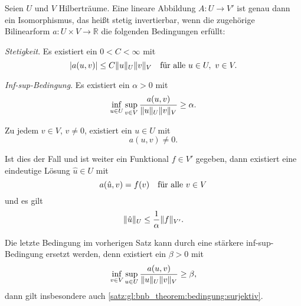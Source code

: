\begin{Satz}
\label{satz:gl:bnb_theorem}
    Seien $U$ und $V$ Hilberträume.
    Eine lineare Abbildung $A \colon U \to V'$ ist genau dann ein Isomorphismus, das heißt stetig invertierbar, wenn die zugehörige Bilinearform $a \colon U \times V \to \mathbb{R}$ die folgenden Bedingungen erfüllt:
    \begin{thmenumerate}
        \item \label{satz:gl:bnb_theorem:bedingung:stetig}
        \emph{Stetigkeit}.
        Es existiert ein $0 < C < \infty$ mit
        \begin{equation}
            \abs{a(u, v)} \leq C \norm{u}_{U} \norm{v}_{V} \quad \fa u \in U,~v\in V.
        \end{equation}
        \item \label{satz:gl:bnb_theorem:bedingung:inf_sup}
        \emph{Inf-sup-Bedingung}.
        Es existiert ein $\alpha > 0$ mit
        \begin{equation}
            \inf_{u \in U} \sup_{v \in V} \frac{a(u, v)}{\norm{u}_{U} \norm{v}_{V}} \geq \alpha.
        \end{equation}
        \item \label{satz:gl:bnb_theorem:bedingung:surjektiv}
        Zu jedem $v \in V$, $v \neq 0$, existiert ein $u \in U$ mit
        \begin{equation}
            a(u, v) \neq 0.
        \end{equation}
    \end{thmenumerate}
    Ist dies der Fall und ist weiter ein Funktional $f \in V'$ gegeben, dann existiert eine eindeutige Lösung $\hat u \in U$ mit
    \begin{equation}
        a(\hat u, v) = f(v) \quad \fa v \in V
    \end{equation}
    und es gilt
    \begin{equation}
        \norm{\hat u}_{U} \leq \frac{1}{\alpha} \norm{f}_{V'}.
    \end{equation}
\end{Satz}

\begin{Bemerkung}
    Die letzte Bedingung im vorherigen Satz kann durch eine stärkere inf-sup-Bedingung ersetzt werden, denn existiert ein $\beta > 0$ mit
    \begin{equation}
        \inf_{v \in V} \sup_{u \in U} \frac{a(u, v)}{\norm{u}_{U} \norm{v}_{V}} \geq \beta,
    \end{equation}
    dann gilt insbesondere auch \ref{satz:gl:bnb_theorem:bedingung:surjektiv}.
\end{Bemerkung}

